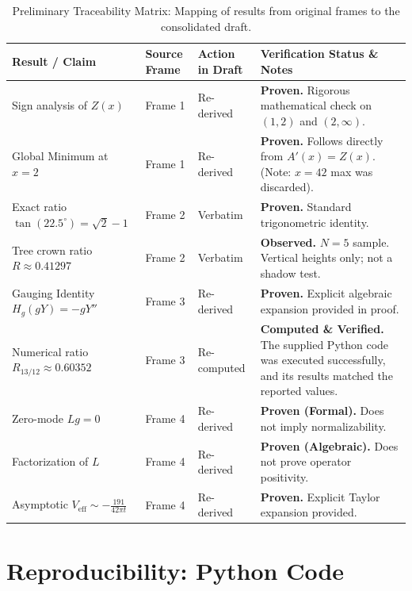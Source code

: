 \documentclass[11pt,a4paper]{article}
\begin{document}
\begin{table}[H]
\centering
\caption{Preliminary Traceability Matrix: Mapping of results from original frames to the consolidated draft.}
\label{tab:traceability}
\scriptsize
\begin{tabular}{p{2.8cm} p{2.2cm} p{2.5cm} p{6cm}}
\toprule
\textbf{Result / Claim} & \textbf{Source Frame} & \textbf{Action in Draft} & \textbf{Verification Status \& Notes} \\
\midrule
Sign analysis of \(Z(x)\) & Frame 1 & Re-derived & \textbf{Proven.} Rigorous mathematical check on \((1,2)\) and \((2,\infty)\). \\
\midrule
Global Minimum at \(x=2\) & Frame 1 & Re-derived & \textbf{Proven.} Follows directly from \(A'(x)=Z(x)\). (Note: \(x=42\) max was discarded). \\
\midrule
Exact ratio \(\tan(22.5^\circ) = \sqrt{2}-1\) & Frame 2 & Verbatim & \textbf{Proven.} Standard trigonometric identity. \\
\midrule
Tree crown ratio \(R \approx 0.41297\) & Frame 2 & Verbatim & \textbf{Observed.} \(N=5\) sample. Vertical heights only; not a shadow test. \\
\midrule
Gauging Identity \(H_g(gY) = -gY''\) & Frame 3 & Re-derived & \textbf{Proven.} Explicit algebraic expansion provided in proof. \\
\midrule
Numerical ratio \(R_{13/12} \approx 0.60352\) & Frame 3 & Re-computed & \textbf{Computed \& Verified.} The supplied Python code was executed successfully, and its results matched the reported values. \\
\midrule
Zero-mode \(Lg = 0\) & Frame 4 & Re-derived & \textbf{Proven (Formal).} Does not imply normalizability. \\
\midrule
Factorization of \(L\) & Frame 4 & Re-derived & \textbf{Proven (Algebraic).} Does not prove operator positivity. \\
\midrule
Asymptotic \(V_{\text{eff}} \sim -\frac{191}{42\pi t}\) & Frame 4 & Re-derived & \textbf{Proven.} Explicit Taylor expansion provided. \\
\bottomrule
\end{tabular}
\end{table}

\section{Reproducibility: Python Code}
\label{app:code}
\end{document}
